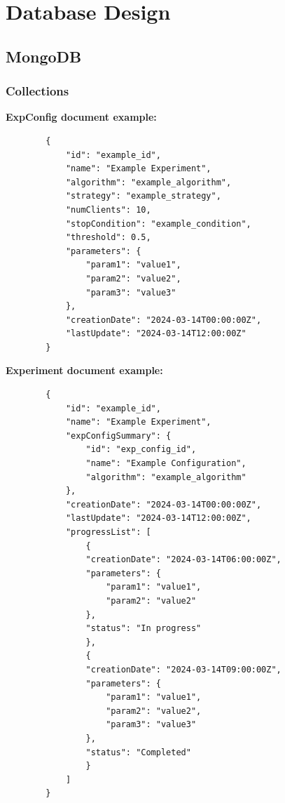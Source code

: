 \newpage
\section{Database Design}

\subsection{MongoDB}
\subsubsection{Collections}
\textbf{ExpConfig document example:} \begin{verbatim}
        {
            "id": "example_id",
            "name": "Example Experiment",
            "algorithm": "example_algorithm",
            "strategy": "example_strategy",
            "numClients": 10,
            "stopCondition": "example_condition",
            "threshold": 0.5,
            "parameters": {
                "param1": "value1",
                "param2": "value2",
                "param3": "value3"
            },
            "creationDate": "2024-03-14T00:00:00Z",
            "lastUpdate": "2024-03-14T12:00:00Z"
        }
    \end{verbatim}
\textbf{Experiment document example:} \begin{verbatim}
        {
            "id": "example_id",
            "name": "Example Experiment",
            "expConfigSummary": {
                "id": "exp_config_id",
                "name": "Example Configuration",
                "algorithm": "example_algorithm"
            },
            "creationDate": "2024-03-14T00:00:00Z",
            "lastUpdate": "2024-03-14T12:00:00Z",
            "progressList": [
                {
                "creationDate": "2024-03-14T06:00:00Z",
                "parameters": {
                    "param1": "value1",
                    "param2": "value2"
                },
                "status": "In progress"
                },
                {
                "creationDate": "2024-03-14T09:00:00Z",
                "parameters": {
                    "param1": "value1",
                    "param2": "value2",
                    "param3": "value3"
                },
                "status": "Completed"
                }
            ]
        }
    \end{verbatim}

